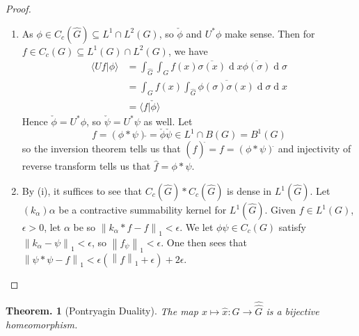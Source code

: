 \documentclass[11pt, a4paper]{memoir}
\newcommand{\norm}[1]{\ensuremath{\left\lVert#1\right\rVert}}
\theoremstyle{change}
\newtheorem{theorem}{Theorem.}[section]
\theoremstyle{plain}
\theoremstyle{nonumberplain}
\newtheorem{proof}{Proof}
\renewcommand{\d}[1]{\ensuremath{\operatorname{d}\!{#1}}}
\numberwithin{equation}{section}
\begin{document}
\begin{proof}
    \begin{enumerate}[nl,r]
        \item As $\phi\in C_c(\widehat{G})\subseteq L^1\cap L^2(G)$, so $\check{\phi}$ and $U^*\phi$ make sense.
            Then for $f\in C_c(G)\subseteq L^1(G)\cap L^2(G)$, we have
            \begin{align*}
                \langle Uf|\phi\rangle&=\int_{\widehat{G}}\int_Gf(x)\overline{\sigma(x)}\d{x}\overline{\phi(\sigma)}\d{\sigma}\\
                                      &= \int_Gf(x)\overline{\int_{\widehat{G}}\phi(\sigma)\sigma(x)\d{\sigma}}\d{x}\\
                                      &= \langle f|\check{\phi}\rangle
            \end{align*}
            Hence $\check{\phi}=U^*\phi$, so $\check{\psi}=U^*\psi$ as well.
            Let
            \begin{equation*}
                f = (\phi*\psi){\check{}}=\check{\phi}\check{\psi}\in L^1\cap B(G)=B^1(G)
            \end{equation*}
            so the inversion theorem tells us that $(\hat{f})^{\check{}}=f=(\phi*\psi)^{\check{}}$ and injectivity of reverse transform tells us that $\hat{f}=\phi*\psi$.
        \item By (i), it suffices to see that $C_c(\widehat{G})*C_c(\widehat{G})$ is dense in $L^1(\widehat{G})$.
            Let $(k_\alpha)\alpha$ be a contractive summability kernel for $L^1(\widehat{G})$.
            Given $f\in L^1(G)$, $\epsilon>0$, let $\alpha$ be so $\norm{k_\alpha*f-f}_1<\epsilon$.
            We let $\phi\psi\in C_c(G)$ satisfy $\norm{k_\alpha-\psi}_1<\epsilon$, so $\norm{f_\psi}_1<\epsilon$.
            One then sees that $\norm{\psi*\psi-f}_1<\epsilon(\norm{f}_1+\epsilon)+2\epsilon$.
    \end{enumerate}
\end{proof}
\begin{theorem}[Pontryagin Duality]
    The map $x\mapsto\hat{x}:G\to\widehat{\widehat{G}}$ is a bijective homeomorphism.
\end{theorem}
\end{document}
